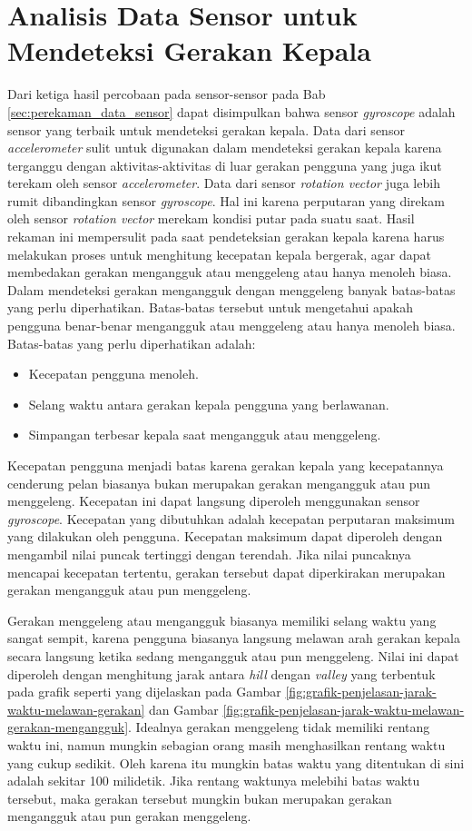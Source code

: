 \section{Analisis Data Sensor untuk Mendeteksi Gerakan Kepala}

Dari ketiga hasil percobaan pada sensor-sensor pada Bab \ref{sec:perekaman_data_sensor} dapat disimpulkan bahwa sensor \textit{gyroscope} adalah sensor yang terbaik untuk mendeteksi gerakan kepala. Data dari sensor \textit{accelerometer} sulit untuk digunakan dalam mendeteksi gerakan kepala karena terganggu dengan aktivitas-aktivitas di luar gerakan pengguna yang juga ikut terekam oleh sensor \textit{accelerometer}. Data dari sensor \textit{rotation vector} juga lebih rumit dibandingkan sensor \textit{gyroscope}. Hal ini karena perputaran yang direkam oleh sensor \textit{rotation vector} merekam kondisi putar pada suatu saat. Hasil rekaman ini mempersulit pada saat pendeteksian gerakan kepala karena harus melakukan proses untuk menghitung kecepatan kepala bergerak, agar dapat membedakan gerakan mengangguk atau menggeleng atau hanya menoleh biasa. 
Dalam mendeteksi gerakan mengangguk dengan menggeleng banyak batas-batas yang perlu diperhatikan. Batas-batas tersebut untuk mengetahui apakah pengguna benar-benar mengangguk atau menggeleng atau hanya menoleh biasa. Batas-batas yang perlu diperhatikan adalah:

\begin{itemize}
	\item Kecepatan pengguna menoleh.
	\item Selang waktu antara gerakan kepala pengguna yang berlawanan.
	\item Simpangan terbesar kepala saat mengangguk atau menggeleng.
\end{itemize}

Kecepatan pengguna menjadi batas karena gerakan kepala yang kecepatannya cenderung pelan biasanya bukan merupakan gerakan mengangguk atau pun menggeleng. Kecepatan ini dapat langsung diperoleh menggunakan sensor \textit{gyroscope}. Kecepatan yang dibutuhkan adalah kecepatan perputaran maksimum yang dilakukan oleh pengguna. Kecepatan maksimum dapat diperoleh dengan mengambil nilai puncak tertinggi dengan terendah. Jika nilai puncaknya mencapai kecepatan tertentu, gerakan tersebut dapat diperkirakan merupakan gerakan mengangguk atau pun menggeleng.

Gerakan menggeleng atau mengangguk biasanya memiliki selang waktu yang sangat sempit, karena pengguna biasanya langsung melawan arah gerakan kepala secara langsung ketika sedang mengangguk atau pun menggeleng. Nilai ini dapat diperoleh dengan menghitung jarak antara \textit{hill} dengan \textit{valley} yang terbentuk pada grafik seperti yang dijelaskan pada Gambar \ref{fig:grafik-penjelasan-jarak-waktu-melawan-gerakan} dan Gambar \ref{fig:grafik-penjelasan-jarak-waktu-melawan-gerakan-mengangguk}. Idealnya gerakan menggeleng tidak memiliki rentang waktu ini, namun mungkin sebagian orang masih menghasilkan rentang waktu yang cukup sedikit. Oleh karena itu mungkin batas waktu yang ditentukan di sini adalah sekitar 100 milidetik. Jika rentang waktunya melebihi batas waktu tersebut, maka gerakan tersebut mungkin bukan merupakan gerakan mengangguk atau pun gerakan menggeleng. 

